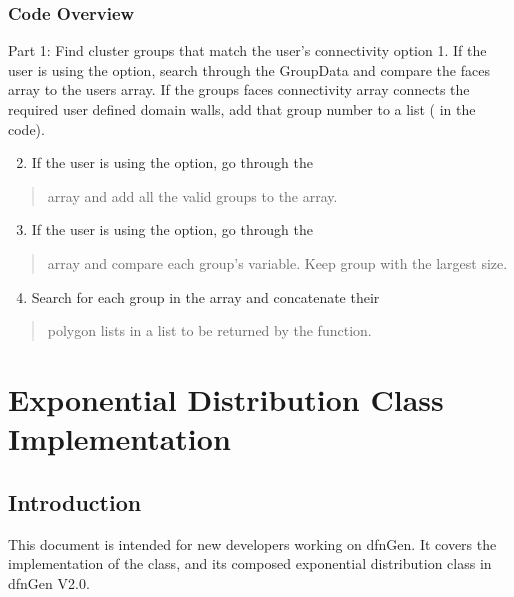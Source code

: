 \documentclass[letterpaper,10pt,english]{sphinxmanual}
\begin{document}
\subsubsection{Code Overview}
\label{dfngen:id1}
Part 1: Find cluster groups that match the user’s
connectivity option 1.  If the user is using the  option,
search through the GroupData and compare the  faces array to the
users  array. If the groups faces connectivity array connects
the required user defined domain walls, add that group number to a list
( in the code).
\begin{enumerate}
\setcounter{enumi}{1}
\item {} 
If the user is using the  option, go through the

\end{enumerate}
\begin{quote}

 array and add all the valid groups to the 
array.
\end{quote}
\begin{enumerate}
\setcounter{enumi}{2}
\item {} 
If the user is using the  option, go through the

\end{enumerate}
\begin{quote}

 array and compare each group’s 
variable. Keep group with the largest size.
\end{quote}
\begin{enumerate}
\setcounter{enumi}{3}
\item {} 
Search for each group in the  array and concatenate their

\end{enumerate}
\begin{quote}

polygon lists in a list to be returned by the function.
\end{quote}


\section{Exponential Distribution Class Implementation}
\label{dfngen:exponential-distribution-class-implementation}

\subsection{Introduction}
\label{dfngen:id2}
This document is intended for new developers working
on dfnGen. It covers the implementation of the  class, and its
composed exponential distribution class  in dfnGen V2.0.
\end{document}
